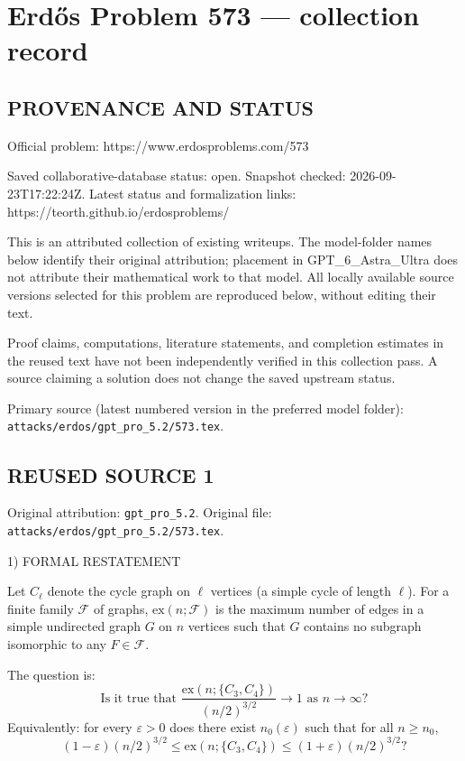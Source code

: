 \section*{Erd\H{o}s Problem 573 --- collection record}

\subsection*{PROVENANCE AND STATUS}
Official problem: https://www.erdosproblems.com/573

Saved collaborative-database status: open.
Snapshot checked: 2026-09-23T17:22:24Z.
Latest status and formalization links: https://teorth.github.io/erdosproblems/

This is an attributed collection of existing writeups. The model-folder names below identify their original attribution; placement in GPT\_6\_Astra\_Ultra does not attribute their mathematical work to that model. All locally available source versions selected for this problem are reproduced below, without editing their text.

Proof claims, computations, literature statements, and completion estimates in the reused text have not been independently verified in this collection pass. A source claiming a solution does not change the saved upstream status.

Primary source (latest numbered version in the preferred model folder): \texttt{attacks/erdos/gpt\_pro\_5.2/573.tex}.

\subsection*{REUSED SOURCE 1}
Original attribution: \texttt{gpt\_pro\_5.2}.
Original file: \texttt{attacks/erdos/gpt\_pro\_5.2/573.tex}.



1) FORMAL RESTATEMENT

Let $C_\ell$ denote the cycle graph on $\ell$ vertices (a simple cycle of length $\ell$).  
For a finite family $\mathcal{F}$ of graphs, $\mathrm{ex}(n;\mathcal{F})$ is the maximum number of edges in a simple undirected graph $G$ on $n$ vertices such that $G$ contains no subgraph isomorphic to any $F\in\mathcal{F}$.

The question is:
\[
\text{Is it true that }\frac{\mathrm{ex}(n;\{C_3,C_4\})}{(n/2)^{3/2}}\to 1\text{ as }n\to\infty? 
\]
Equivalently: for every $\varepsilon>0$ does there exist $n_0(\varepsilon)$ such that for all $n\ge n_0$,
\[
(1-\varepsilon)(n/2)^{3/2}\le \mathrm{ex}(n;\{C_3,C_4\})\le (1+\varepsilon)(n/2)^{3/2}?
\]

